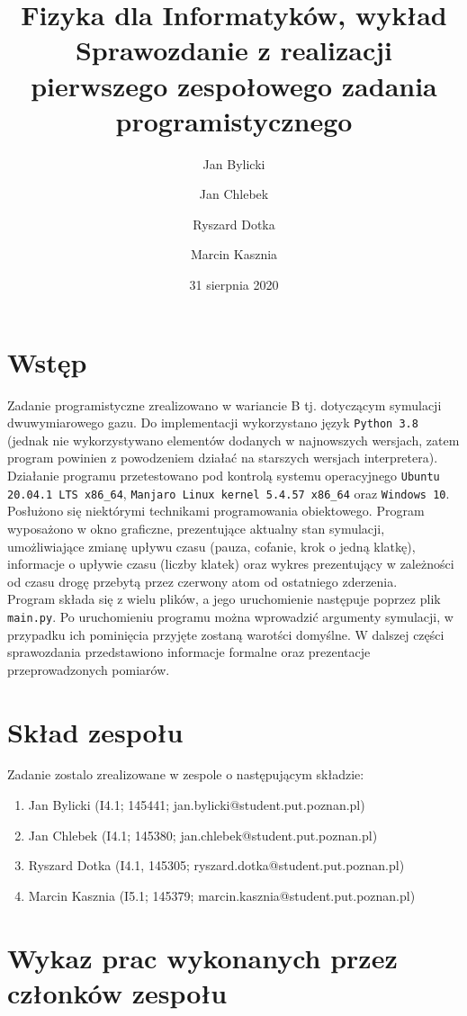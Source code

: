 \documentclass{article}
\title{Fizyka dla Informatyków, wykład\\ Sprawozdanie z realizacji pierwszego zespołowego zadania programistycznego}
\author{Jan Bylicki \and Jan Chlebek \and Ryszard Dotka \and Marcin Kasznia}
\date{31 sierpnia 2020}
\begin{document}
\maketitle

\section{Wstęp}
Zadanie programistyczne zrealizowano w wariancie B tj. dotyczącym symulacji dwuwymiarowego gazu. Do implementacji wykorzystano język \verb+Python 3.8+ (jednak nie wykorzystywano elementów dodanych w najnowszych wersjach, zatem program powinien z powodzeniem działać na starszych wersjach interpretera). Działanie programu przetestowano pod kontrolą systemu operacyjnego \verb+Ubuntu 20.04.1 LTS x86_64+, \verb+Manjaro Linux kernel 5.4.57 x86_64+ oraz \verb+Windows 10+. Posłużono się niektórymi technikami programowania obiektowego. Program wyposażono w okno graficzne, prezentujące aktualny stan symulacji, umożliwiające zmianę upływu czasu (pauza, cofanie, krok o jedną klatkę), informacje o upływie czasu (liczby klatek) oraz wykres prezentujący w zależności od czasu drogę przebytą przez czerwony atom od ostatniego zderzenia.\\
Program składa się z wielu plików, a jego uruchomienie następuje poprzez plik \verb+main.py+. Po uruchomieniu programu można wprowadzić argumenty symulacji, w przypadku ich pominięcia przyjęte zostaną warotści domyślne.
W dalszej części sprawozdania przedstawiono informacje formalne oraz prezentacje przeprowadzonych pomiarów.

\section{Skład zespołu}
Zadanie zostalo zrealizowane w zespole o następującym składzie:
\begin{enumerate}
    \item Jan Bylicki (I4.1; 145441; jan.bylicki@student.put.poznan.pl)
    \item Jan Chlebek (I4.1; 145380; jan.chlebek@student.put.poznan.pl)
    \item Ryszard Dotka (I4.1, 145305; ryszard.dotka@student.put.poznan.pl)
    \item Marcin Kasznia (I5.1; 145379; marcin.kasznia@student.put.poznan.pl)
\end{enumerate}

\section{Wykaz prac wykonanych przez członków zespołu}
\end{document}
